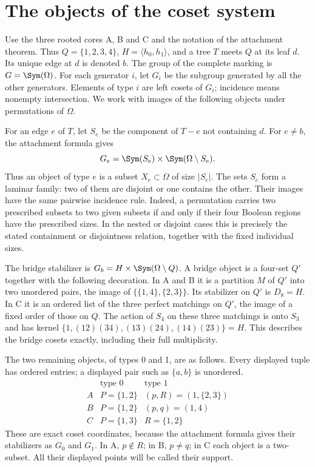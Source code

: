 \section{The objects of the coset system}
Use the three rooted cores A, B and C and the notation of the attachment
theorem. Thus $Q=\{1,2,3,4\}$, $H=\langle h_0,h_1\rangle$, and a tree
$T$ meets $Q$ at its leaf $d$. Its unique edge at $d$ is denoted $b$.
The group of the complete marking is $G=\Sym(\Omega)$.
For each generator $i$, let $G_i$ be the subgroup generated by all the
other generators. Elements of type $i$ are left cosets of $G_i$;
incidence means nonempty intersection. We work with images of the
following objects under permutations of $\Omega$.

For an edge $e$ of $T$, let $S_e$ be the component of $T-e$ not containing
$d$. For $e\ne b$, the attachment formula gives
\[
G_e=\Sym(S_e)\times\Sym(\Omega\setminus S_e).
\]
Thus an object of type $e$ is a subset $X_e\subset\Omega$ of size $|S_e|$.
The sets $S_e$ form a laminar family: two of them are disjoint or one
contains the other. Their images have the same pairwise incidence rule.
Indeed, a permutation carries two prescribed subsets to two given subsets
if and only if their four Boolean regions have the prescribed sizes.
In the nested or disjoint cases this is precisely the stated containment
or disjointness relation, together with the fixed individual sizes.

The bridge stabilizer is $G_b=H\times\Sym(\Omega\setminus Q)$.
A bridge object is a four-set $Q'$ together with the following decoration.
In A and B it is a partition $M$ of $Q'$ into two unordered pairs,
the image of $\{\{1,4\},\{2,3\}\}$. Its stabilizer on $Q'$ is $D_8=H$.
In C it is an ordered list of the three perfect matchings on $Q'$,
the image of a fixed order of those on $Q$.
The action of $S_4$ on these three matchings is onto $S_3$ and has
kernel $\{1,(12)(34),(13)(24),(14)(23)\}=H$.
This describes the bridge cosets exactly, including their full multiplicity.

The two remaining objects, of types 0 and 1, are as follows.
Every displayed tuple has ordered entries; a displayed pair such as
$\{a,b\}$ is unordered.
\[
\begin{array}{c|cc}
 &\text{type }0&\text{type }1\\\hline
 A& P=\{1,2\}&(p,R)=(1,\{2,3\})\\
 B& P=\{1,2\}&(p,q)=(1,4)\\
 C& P=\{1,3\}&R=\{1,2\}
\end{array}
\]
These are exact coset coordinates, because the attachment formula gives
their stabilizers as $G_0$ and $G_1$. In A, $p\notin R$; in B,
$p\ne q$; in C each object is a two-subset. All their displayed points
will be called their support.

